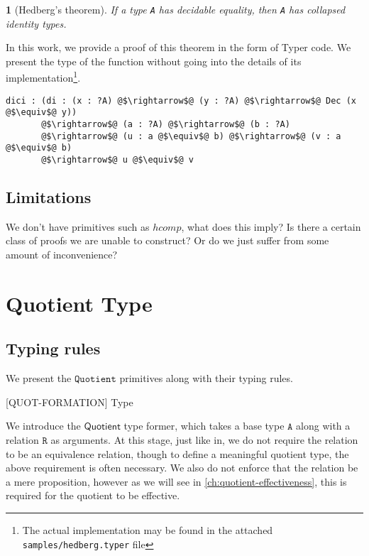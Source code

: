 \documentclass[12pt,twoside,maitrise]{dms}
\newtheorem{theo}[cor]{\theoremname}
\theoremstyle{definition}
\numberwithin{equation}{section}
\numberwithin{table}{chapter}
\numberwithin{figure}{chapter}
\newcommand\kw[1] {\textsf{#1}}
\newcommand\id[1] {\texttt{#1}}
\newcommand\fn[1] {\texttt{#1}}
\begin{document}
\begin{theo}[Hedberg's theorem\cite{hedberg1998coherence}]
If a type \fn{A} has decidable equality, then \fn{A} has collapsed identity
types.
\end{theo}

In this work, we provide a proof of this theorem in the form of Typer code. We
present the type of the function without going into the details of its
implementation\footnote{The actual implementation may be found in the attached \fn{samples/hedberg.typer} file}.

\begin{verbatim}
dici : (di : (x : ?A) @$\rightarrow$@ (y : ?A) @$\rightarrow$@ Dec (x @$\equiv$@ y))
       @$\rightarrow$@ (a : ?A) @$\rightarrow$@ (b : ?A)
       @$\rightarrow$@ (u : a @$\equiv$@ b) @$\rightarrow$@ (v : a @$\equiv$@ b)
       @$\rightarrow$@ u @$\equiv$@ v
\end{verbatim}

\section{Limitations}
We don't have primitives such as $hcomp$, what does this imply? Is there a
certain class of proofs we are unable to construct? Or do we just suffer from
some amount of inconvenience?


\chapter{Quotient Type}\label{ch:quot}
\section{Typing rules}
We present the $\id{Quotient}$ primitives along with their typing rules.

\begin{prooftree*}
   \hypo{\oftype{\ctx}{\id{A}}{\kw{Type}}}
   \hypo{\oftype{\ctx}{\id{R}}{\id{A} \rightarrow \id{A} \rightarrow \kw{Type}}}
   [\kw{QUOT-FORMATION}]{\oftype{\ctx}{\Funapp{\kw{Quotient}}{\id{A}}{\id{R}}}
                                             {\kw{Type}}}
\end{prooftree*}

We introduce the $\kw{Quotient}$ type former, which takes a base type $\id{A}$
along with a relation $\id{R}$ as arguments. At this stage, just like
in\cite{hofmann1995simple}, we do not require the relation to be an equivalence
relation, though to define a meaningful quotient type, the above
requirement is often necessary. We also do not enforce that the relation be a
mere proposition, however as we will see in \autoref{ch:quotient-effectiveness},
this is required for the quotient to be effective.
\end{document}
